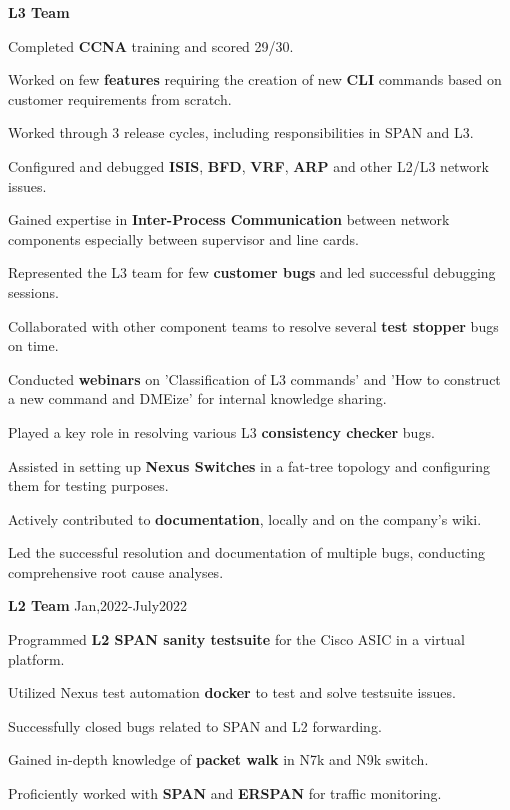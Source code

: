 \documentclass[10pt]{article}
\begin{document}
\quad \textbf{L3 Team}
\begin{compactitem}
\item Completed \textbf{CCNA} training and scored 29/30.
\item Worked on few \textbf{features} requiring the creation of new \textbf{CLI} commands based on customer requirements from scratch.
\item Worked through 3 release cycles, including responsibilities in SPAN and L3.
\item Configured and debugged \textbf{ISIS}, \textbf{BFD}, \textbf{VRF}, \textbf{ARP} and other L2/L3 network issues.
\item Gained expertise in \textbf{Inter-Process Communication} between network components especially between supervisor and line cards.
\item Represented the L3 team for few \textbf{customer bugs} and led successful debugging sessions.
\item Collaborated with other component teams to resolve several \textbf{test stopper} bugs on time.
\item Conducted \textbf{webinars} on 'Classification of L3 commands' and 'How to construct a new command and DMEize' for internal knowledge sharing.
\item Played a key role in resolving various L3 \textbf{consistency checker} bugs.
\item Assisted in setting up \textbf{Nexus Switches} in a fat-tree topology and configuring them for testing purposes.
\item Actively contributed to \textbf{documentation}, locally and on the company's wiki.
\item Led the successful resolution and documentation of multiple bugs, conducting comprehensive root cause analyses.
\end{compactitem}

\quad \textbf{L2 Team}
\hfill Jan,2022-July2022
\begin{compactitem}

\item    Programmed \textbf{L2 SPAN sanity testsuite} for the Cisco ASIC in a virtual platform.
\item    Utilized Nexus test automation \textbf{docker} to test and solve testsuite issues.
\item    Successfully closed bugs related to SPAN and L2 forwarding.
\item    Gained in-depth knowledge of \textbf{packet walk} in N7k and N9k switch.
\item    Proficiently worked with \textbf{SPAN} and \textbf{ERSPAN} for traffic monitoring.
\end{compactitem}
\end{document}
